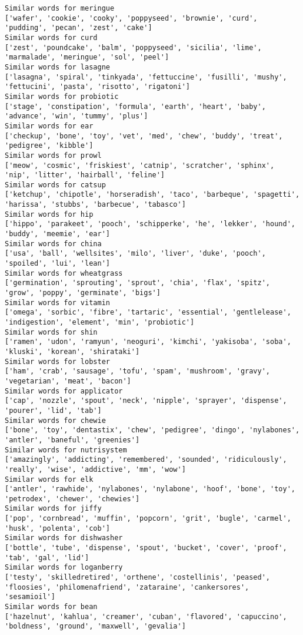 \documentclass[11pt]{article}
\begin{document}
\begin{Verbatim}[commandchars=\\\{\}]
Similar words for meringue
['wafer', 'cookie', 'cooky', 'poppyseed', 'brownie', 'curd', 'pudding', 'pecan', 'zest', 'cake']
Similar words for curd
['zest', 'poundcake', 'balm', 'poppyseed', 'sicilia', 'lime', 'marmalade', 'meringue', 'sol', 'peel']
Similar words for lasagne
['lasagna', 'spiral', 'tinkyada', 'fettuccine', 'fusilli', 'mushy', 'fettucini', 'pasta', 'risotto', 'rigatoni']
Similar words for probiotic
['stage', 'constipation', 'formula', 'earth', 'heart', 'baby', 'advance', 'win', 'tummy', 'plus']
Similar words for ear
['checkup', 'bone', 'toy', 'vet', 'med', 'chew', 'buddy', 'treat', 'pedigree', 'kibble']
Similar words for prowl
['meow', 'cosmic', 'friskiest', 'catnip', 'scratcher', 'sphinx', 'nip', 'litter', 'hairball', 'feline']
Similar words for catsup
['ketchup', 'chipotle', 'horseradish', 'taco', 'barbeque', 'spagetti', 'harissa', 'stubbs', 'barbecue', 'tabasco']
Similar words for hip
['hippo', 'parakeet', 'pooch', 'schipperke', 'he', 'lekker', 'hound', 'buddy', 'meemie', 'ear']
Similar words for china
['usa', 'ball', 'wellsites', 'milo', 'liver', 'duke', 'pooch', 'spoiled', 'lui', 'lean']
Similar words for wheatgrass
['germination', 'sprouting', 'sprout', 'chia', 'flax', 'spitz', 'grow', 'poppy', 'germinate', 'bigs']
Similar words for vitamin
['omega', 'sorbic', 'fibre', 'tartaric', 'essential', 'gentlelease', 'indigestion', 'element', 'min', 'probiotic']
Similar words for shin
['ramen', 'udon', 'ramyun', 'neoguri', 'kimchi', 'yakisoba', 'soba', 'kluski', 'korean', 'shirataki']
Similar words for lobster
['ham', 'crab', 'sausage', 'tofu', 'spam', 'mushroom', 'gravy', 'vegetarian', 'meat', 'bacon']
Similar words for applicator
['cap', 'nozzle', 'spout', 'neck', 'nipple', 'sprayer', 'dispense', 'pourer', 'lid', 'tab']
Similar words for chewie
['bone', 'toy', 'dentastix', 'chew', 'pedigree', 'dingo', 'nylabones', 'antler', 'baneful', 'greenies']
Similar words for nutrisystem
['amazingly', 'addicting', 'remembered', 'sounded', 'ridiculously', 'really', 'wise', 'addictive', 'mm', 'wow']
Similar words for elk
['antler', 'rawhide', 'nylabones', 'nylabone', 'hoof', 'bone', 'toy', 'petrodex', 'chewer', 'chewies']
Similar words for jiffy
['pop', 'cornbread', 'muffin', 'popcorn', 'grit', 'bugle', 'carmel', 'husk', 'polenta', 'cob']
Similar words for dishwasher
['bottle', 'tube', 'dispense', 'spout', 'bucket', 'cover', 'proof', 'tab', 'gal', 'lid']
Similar words for loganberry
['testy', 'skilledretired', 'orthene', 'costellinis', 'peased', 'floosies', 'philomenafriend', 'zataraine', 'cankersores', 'sesamioil']
Similar words for bean
['hazelnut', 'kahlua', 'creamer', 'cuban', 'flavored', 'capuccino', 'boldness', 'ground', 'maxwell', 'gevalia']

\end{Verbatim}
\end{document}
